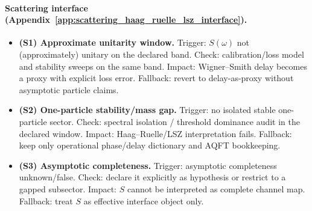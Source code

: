 \paragraph{Scattering interface (Appendix~\ref{app:scattering_haag_ruelle_lsz_interface}).}
\begin{itemize}
\item \textbf{(S1) Approximate unitarity window.}
  Trigger: $S(\omega)$ not (approximately) unitary on the declared band.
  Check: calibration/loss model and stability sweeps on the same band.
  Impact: Wigner--Smith delay becomes a proxy with explicit loss error.
  Fallback: revert to delay-as-proxy without asymptotic particle claims.
\item \textbf{(S2) One-particle stability/mass gap.}
  Trigger: no isolated stable one-particle sector.
  Check: spectral isolation / threshold dominance audit in the declared window.
  Impact: Haag--Ruelle/LSZ interpretation fails.
  Fallback: keep only operational phase/delay dictionary and AQFT bookkeeping.
\item \textbf{(S3) Asymptotic completeness.}
  Trigger: asymptotic completeness unknown/false.
  Check: declare it explicitly as hypothesis or restrict to a gapped subsector.
  Impact: $S$ cannot be interpreted as complete channel map.
  Fallback: treat $S$ as effective interface object only.
\end{itemize}

